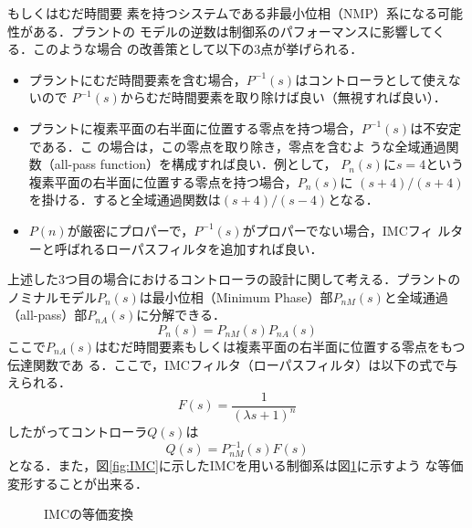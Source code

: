 \documentclass[a4paper,12pt]{jarticle}
\begin{document}
もしくはむだ時間要
素を持つシステムである非最小位相（NMP）系になる可能性がある．プラントの
モデルの逆数は制御系のパフォーマンスに影響してくる．このような場合
の改善策として以下の3点が挙げられる．
%
\begin{itemize}
 \item プラントにむだ時間要素を含む場合，$P^{-1}(s)$はコントローラとして使えないので
	   $P^{-1}(s)$からむだ時間要素を取り除けば良い（無視すれば良い）．
	   
 \item プラントに複素平面の右半面に位置する零点を持つ場合，$P^{-1}(s)$は不安定である．こ
	   の場合は，この零点を取り除き，零点を含むよ
	   うな全域通過関数（all-pass function）を構成すれば良い．例として，
	   $P_n(s)$に$s=4$という複素平面の右半面に位置する零点を持つ場合，$P_n(s)$に
	   $(s+4)/(s+4)$を掛ける．すると全域通過関数は$(s+4)/(s-4)$となる．
	   
 \item $P(n)$が厳密にプロパーで，$P^{-1}(s)$がプロパーでない場合，IMCフィ
	   ルターと呼ばれるローパスフィルタを追加すれば良い．
\end{itemize}
%
上述した3つ目の場合におけるコントローラの設計に関して考える．プラントの
ノミナルモデル$P_n(s)$は最小位相（Minimum Phase）部$P_{nM}(s)$と全域通過
（all-pass）部$P_{nA}(s)$に分解できる．
%
\begin{equation}
 P_n(s)=P_{nM}(s)P_{nA}(s)
\end{equation}
%
ここで$P_{nA}(s)$はむだ時間要素もしくは複素平面の右半面に位置する零点をもつ伝達関数であ
る．ここで，IMCフィルタ（ローパスフィルタ）は以下の式で与えられる．
%
\begin{equation}\label{equ:imc_f}
 F(s) = \frac{1}{(\lambda s + 1)^n}
\end{equation}
%
したがってコントローラ$Q(s)$は
%
\begin{equation}\label{equ:imc_c}
 Q(s) = P_{nM}^{-1}(s)F(s)
\end{equation}
%
となる．また，図\ref{fig:IMC}に示したIMCを用いる制御系は図\ref{fig:henkan}に示すよう
な等価変形することが出来る．
%
\begin{figure}[tbp]
  \begin{center} 
  \hfill
  \end{center}
  \caption{IMCの等価変換}
  \label{fig:henkan}
\end{figure}
\end{document}
